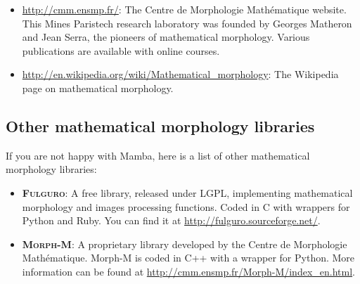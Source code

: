 \documentclass[a4paper,10pt,oneside]{article}
\begin{document}
\begin{itemize}
\item \url{http://cmm.ensmp.fr/}: The Centre de Morphologie Math\'{e}matique
website. This Mines Paristech research laboratory was founded by Georges Matheron 
and Jean Serra, the pioneers of mathematical
morphology. Various publications are available with online courses.
\item \url{http://en.wikipedia.org/wiki/Mathematical_morphology}: The Wikipedia
page on mathematical morphology.
\end{itemize}

\subsection{Other mathematical morphology libraries}

If you are not happy with Mamba, here is a list of other mathematical morphology
libraries:

\begin{itemize}
\item \textsc{\textbf{Fulguro}}: A free library, released under LGPL, implementing
mathematical morphology and images processing functions. Coded in C with wrappers
for Python and Ruby. You can find it at \url{http://fulguro.sourceforge.net/}.
\item \textsc{\textbf{Morph-M}}: A proprietary library developed by the Centre
de Morphologie Math\'{e}matique. Morph-M is coded in C++ with a wrapper for
Python. More information can be found at \url{http://cmm.ensmp.fr/Morph-M/index_en.html}.
\end{itemize}
\end{document}
